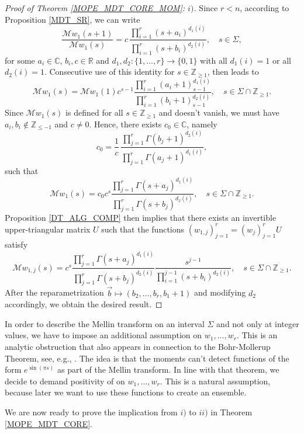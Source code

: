 \documentclass[a4paper,12pt,oneside]{article}
\theoremstyle{definition}
\newcommand{\Z}{\mathbb{Z}}
\newcommand{\C}{\mathbb{C}}
\newcommand{\R}{\mathbb{R}}
\newcommand{\MT}[1]{\mathcal{M}#1}
\begin{document}
\begin{proof}[Proof of Theorem \ref{MOPE_MDT_CORE_MOM}: $i)$]
    Since $r<n$, according to Proposition \ref{MDT_SR}, we can write
        $$ \frac{\MT{w}_1(s+1)}{\MT{w}_1(s)} = c \, \frac{\prod_{i=1}^{r} (s+a_i)^{d_1(i)}}{\prod_{i=1}^{r} (s+b_i)^{d_2(i)}},\quad s\in\Sigma,$$
    for some $a_i\in\C$, $b_i,c\in\R$ and $d_1,d_2:\{1,\dots,r\}\to \{0,1\}$ with all $d_1(i)=1$ or all $d_2(i)=1$. Consecutive use of this identity for $s\in\Z_{\geq 1}$, then leads to
        $$ \MT{w}_1(s) = \MT{w}_1(1) c^{s-1} \frac{\prod_{i=1}^{r} (a_i+1)_{s-1}^{d_1(i)}}{\prod_{i=1}^{r} (b_i+1)_{s-1}^{d_2(i)}},\quad s\in\Sigma\cap\Z_{\geq 1}.$$
    Since $\MT{w}_1(s)$ is defined for all $s\in\Z_{\geq 1}$ and doesn't vanish, we must have $a_i,b_i\not\in\Z_{\leq -1}$ and $c\neq 0$. Hence, there exists $c_0\in\C$, namely
        $$ c_0 = \frac{1}{c} \, \frac{\prod_{j=1}^{r} \Gamma(b_j+1)^{d_2(i)}}{\prod_{j=1}^{r} \Gamma(a_j+1)^{d_1(i)}}, $$
    such that 
        $$ \MT{w}_1(s) = c_0 c^s \frac{\prod_{j=1}^{r} \Gamma(s+a_j)^{d_1(i)}}{\prod_{j=1}^{r} \Gamma(s+b_j)^{d_2(i)}},\quad s\in\Sigma\cap\Z_{\geq 1}.$$
    Proposition \ref{DT_ALG_COMP} then implies that there exists an invertible upper-triangular matrix $U$ such that the functions $(w_{1,j})_{j=1}^r = (w_j)_{j=1}^r U$ satisfy
    $$ \MT{w_{1,j}}(s) = c^s \frac{\prod_{j=1}^{r} \Gamma(s+a_j)^{d_1(i)}}{\prod_{j=1}^{r} \Gamma(s+b_j)^{d_2(i)}} \frac{s^{j-1}}{\prod_{i=1}^{j-1}(s+b_i)^{d_2(i)}},\quad s\in\Sigma\cap\Z_{\geq 1}.$$
    After the reparametrization $\vec{b}\mapsto (b_2,\dots,b_r,b_1+1)$ and modifying $d_2$ accordingly, we obtain the desired result.
\end{proof}

In order to describe the Mellin transform on an interval $\Sigma$ and not only at integer values, we have to impose an additional assumption on $w_1,\dots,w_r$. This is an analytic obstruction that also appears in connection to the Bohr-Mollerup Theorem, see, e.g., \cite{MZ:B-M}. The idea is that the moments can't detect functions of the form $e^{\sin(\pi s)}$ as part of the Mellin transform. In line with that theorem, we decide to demand positivity of on $w_1,\dots,w_r$. This is a natural assumption, because later we want to use these functions to create an ensemble.
\medbreak

We are now ready to prove the implication from $i)$ to $ii)$ in Theorem \ref{MOPE_MDT_CORE}.
\end{document}
